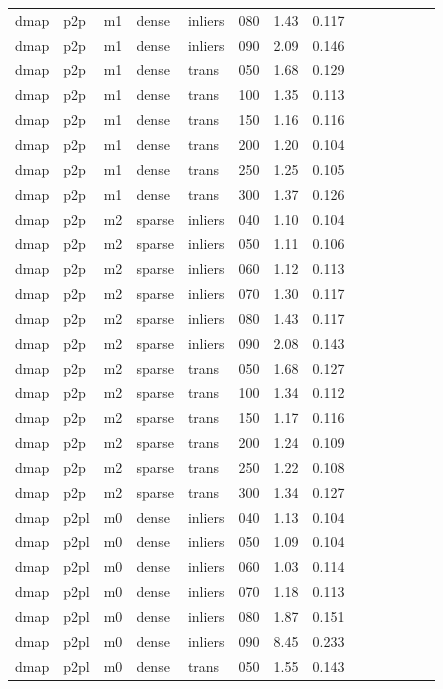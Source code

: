 \begin{table}[htbp]
\begin{tabular}{llllllrrrrrrrr}
  dmap & p2p & m1 & dense & inliers & 080 & 1.43 & 0.117 \\
  dmap & p2p & m1 & dense & inliers & 090 & 2.09 & 0.146 \\
  dmap & p2p & m1 & dense & trans & 050 & 1.68 & 0.129 \\
  dmap & p2p & m1 & dense & trans & 100 & 1.35 & 0.113 \\
  dmap & p2p & m1 & dense & trans & 150 & 1.16 & 0.116 \\
  dmap & p2p & m1 & dense & trans & 200 & 1.20 & 0.104 \\
  dmap & p2p & m1 & dense & trans & 250 & 1.25 & 0.105 \\
  dmap & p2p & m1 & dense & trans & 300 & 1.37 & 0.126 \\
  dmap & p2p & m2 & sparse & inliers & 040 & 1.10 & 0.104 \\
  dmap & p2p & m2 & sparse & inliers & 050 & 1.11 & 0.106 \\
  dmap & p2p & m2 & sparse & inliers & 060 & 1.12 & 0.113 \\
  dmap & p2p & m2 & sparse & inliers & 070 & 1.30 & 0.117 \\
  dmap & p2p & m2 & sparse & inliers & 080 & 1.43 & 0.117 \\
  dmap & p2p & m2 & sparse & inliers & 090 & 2.08 & 0.143 \\
  dmap & p2p & m2 & sparse & trans & 050 & 1.68 & 0.127 \\
  dmap & p2p & m2 & sparse & trans & 100 & 1.34 & 0.112 \\
  dmap & p2p & m2 & sparse & trans & 150 & 1.17 & 0.116 \\
  dmap & p2p & m2 & sparse & trans & 200 & 1.24 & 0.109 \\
  dmap & p2p & m2 & sparse & trans & 250 & 1.22 & 0.108 \\
  dmap & p2p & m2 & sparse & trans & 300 & 1.34 & 0.127 \\
  dmap & p2pl & m0 & dense & inliers & 040 & 1.13 & 0.104 \\
  dmap & p2pl & m0 & dense & inliers & 050 & 1.09 & 0.104 \\
  dmap & p2pl & m0 & dense & inliers & 060 & 1.03 & 0.114 \\
  dmap & p2pl & m0 & dense & inliers & 070 & 1.18 & 0.113 \\
  dmap & p2pl & m0 & dense & inliers & 080 & 1.87 & 0.151 \\
  dmap & p2pl & m0 & dense & inliers & 090 & 8.45 & 0.233 \\
  dmap & p2pl & m0 & dense & trans & 050 & 1.55 & 0.143 \\

\end{tabular}
\end{table}

